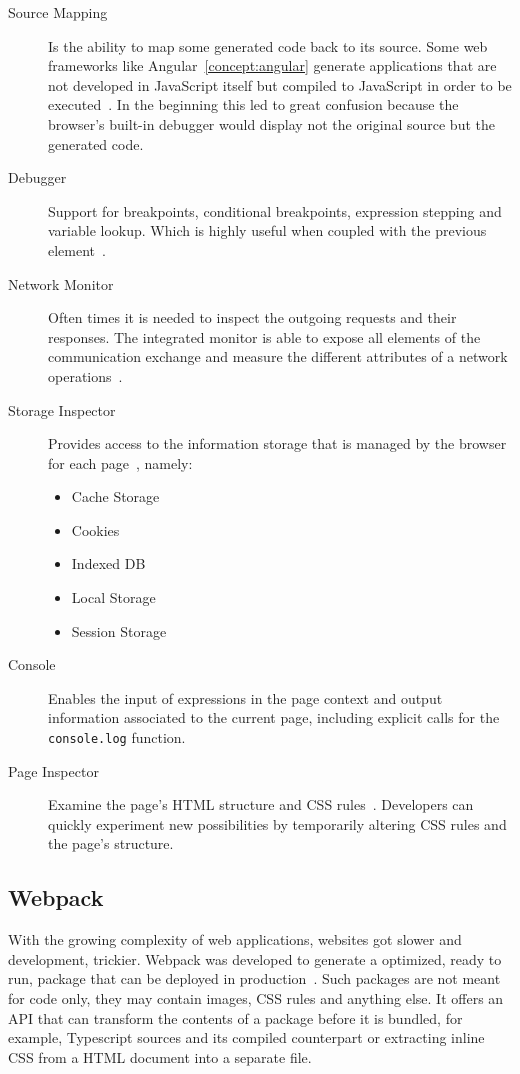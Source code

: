 \begin{description}
\item [Source Mapping] Is the ability to map some generated code back to its source. Some web frameworks like Angular~\ref{concept:angular} generate applications that are not developed in JavaScript itself but compiled to JavaScript in order to be executed~\cite{srcmapping}. In the beginning this led to great confusion because the browser's built-in debugger would display not the original source but the generated code.
\item [Debugger] Support for breakpoints, conditional breakpoints, expression stepping and variable lookup. Which is highly useful when coupled with the previous element~\cite{dbgmodernweb}.
\item [Network Monitor] Often times it is needed to inspect the outgoing requests and their responses. The integrated monitor is able to expose all elements of the communication exchange and measure the different attributes of a network operations~\cite{networkmon}.
\item [Storage Inspector] Provides access to the information storage that is managed by the browser for each page~\cite{storageinspector}, namely:

  \begin{itemize}
  \item Cache Storage
  \item Cookies
  \item Indexed \gls{DB}
  \item Local Storage
  \item Session Storage
  \end{itemize}
\item [Console] Enables the input of expressions in the page context and output information associated to the current page, including explicit calls for the \texttt{console.log} function.
\item [Page Inspector] Examine the page's \gls{HTML} structure and \gls{CSS} rules~\cite{inspector}. Developers can quickly experiment new possibilities by temporarily altering \gls{CSS} rules and the page's structure.
\end{description}

\subsection{Webpack}
With the growing complexity of web applications, websites got slower and development, trickier. Webpack was developed to generate a optimized, ready to run, package that can be deployed in production~\cite{webpack}. Such packages are not meant for code only, they may contain images, \gls{CSS} rules and anything else. It offers an \gls{API} that can transform the contents of a package before it is bundled, for example, Typescript sources and its compiled counterpart or extracting inline \gls{CSS} from a \gls{HTML} document into a separate file.

